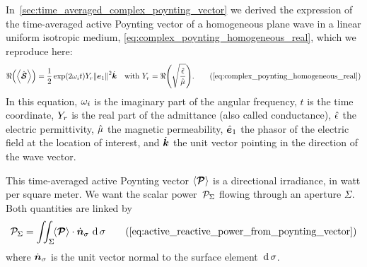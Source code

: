 In~\cref{sec:time_averaged_complex_poynting_vector} we derived the expression of the time-averaged active Poynting vector of a homogeneous plane wave in a linear uniform isotropic medium,
\cref{eq:complex_poynting_homogeneous_real},
which we reproduce here:
\begin{align}
    \Re\left( \Timeavg{\vectcp{\power{S}}} \right)
    &=
    \frac{1}{2}
    \exp(2\omega_\im t)
    Y_\re %
    \norm{\vect{e}_1}^2
    \vectu{k}
    &
    \text{with }
    Y_\re = \Re\left( \sqrt{\frac{\cp{\epsilon}}{\cp{\mu}}} \right)    
    \text{.}
    \tag{\ref{eq:complex_poynting_homogeneous_real}}
\end{align}
In this equation,
$\omega_i$ is the imaginary part of the angular frequency,
$t$ is the time coordinate,
$Y_r$ is the real part of the admittance (also called conductance),
$\hat{\epsilon}$ the electric permittivity,
$\hat{\mu}$ the magnetic permeability,
$\hat{\bm{e}}_1$ the phasor of the electric field at the location of interest, and
$\dot{\bm{k}}$ the unit vector pointing in the direction of the wave vector.

This time-averaged active Poynting vector $\langle \bm{\mathcal{P}} \rangle$ is a directional irradiance, in watt per square meter.
We want the scalar power~$\mathcal{P}_\Sigma$ flowing through an aperture $\Sigma$.
Both quantities are linked by
\begin{equation}
    \power{P}_\Sigma
    =
    \iint_\Sigma
    \!
    \Timeavg{\vect{\mathcal{P}}}
    \cdot
    \vectu{n}_\sigma
    \,
    \dif\sigma
    \tag{\ref{eq:active_reactive_power_from_poynting_vector}}
\end{equation}
where $\dot{\bm{n}}_\sigma$ is the unit vector normal to the surface element~$\operatorname{d}\sigma$.


